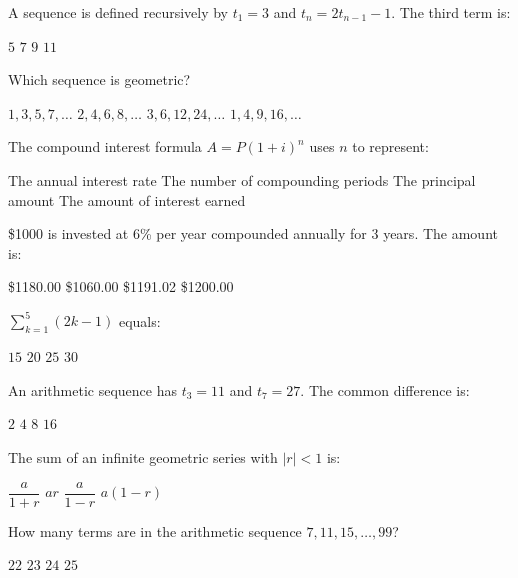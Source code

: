 \documentclass[addpoints]{exam}
\begin{document}
\begin{questions}
\question[1] A sequence is defined recursively by $t_1 = 3$ and $t_n = 2t_{n-1} - 1$.
The third term is:
\begin{choices}
    \choice $5$
    \choice $7$
    \correctchoice $9$
    \choice $11$
\end{choices}

\question[1] Which sequence is geometric?
\begin{choices}
    \choice $1, 3, 5, 7, \ldots$
    \choice $2, 4, 6, 8, \ldots$
    \correctchoice $3, 6, 12, 24, \ldots$
    \choice $1, 4, 9, 16, \ldots$
\end{choices}

\question[1] The compound interest formula $A = P(1 + i)^n$ uses $n$ to represent:
\begin{choices}
    \choice The annual interest rate
    \correctchoice The number of compounding periods
    \choice The principal amount
    \choice The amount of interest earned
\end{choices}

\question[1] \$1000 is invested at 6\% per year compounded annually for 3 years.
The amount is:
\begin{choices}
    \choice \$1180.00
    \choice \$1060.00
    \correctchoice \$1191.02
    \choice \$1200.00
\end{choices}

\question[1] $\displaystyle\sum_{k=1}^{5} (2k - 1)$ equals:
\begin{choices}
    \choice $15$
    \choice $20$
    \correctchoice $25$
    \choice $30$
\end{choices}

\question[1] An arithmetic sequence has $t_3 = 11$ and $t_7 = 27$. The common
difference is:
\begin{choices}
    \choice $2$
    \correctchoice $4$
    \choice $8$
    \choice $16$
\end{choices}

\question[1] The sum of an infinite geometric series with $|r| < 1$ is:
\begin{choices}
    \choice $\dfrac{a}{1+r}$
    \choice $ar$
    \correctchoice $\dfrac{a}{1-r}$
    \choice $a(1-r)$
\end{choices}

\question[1] How many terms are in the arithmetic sequence $7, 11, 15, \ldots, 99$?
\begin{choices}
    \choice $22$
    \choice $23$
    \correctchoice $24$
    \choice $25$
\end{choices}



\end{questions}
\end{document}
